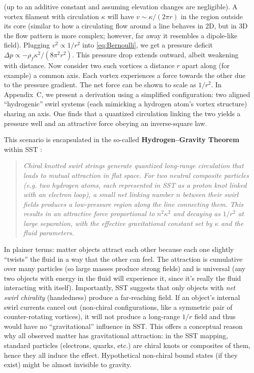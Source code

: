 \documentclass[10pt,reprint,aps,onecolumn,nofootinbib]{revtex4-2}
\newcommand{\rhoF}{\rho_{\!f}}     %
\begin{document}
(up to an additive constant and assuming elevation changes are negligible). A vortex filament with circulation $\kappa$ will have $v \sim \kappa/(2\pi r)$ in the region outside its core (similar to how a circulating flow around a line behaves in 2D, but in 3D the flow pattern is more complex; however, far away it resembles a dipole-like field). Plugging $v^2 \propto 1/r^2$ into \eqref{eq:Bernoulli}, we get a pressure deficit $\Delta p \propto -\rhoF \kappa^2/(8\pi^2 r^2)$. This pressure drop extends outward, albeit weakening with distance. Now consider two such vortices a distance $r$ apart along (for example) a common axis. Each vortex experiences a force towards the other due to the pressure gradient. The net force can be shown to scale as $1/r^2$. In Appendix~C, we present a derivation using a simplified configuration: two aligned ``hydrogenic'' swirl systems (each mimicking a hydrogen atom’s vortex structure) sharing an axis. One finds that a quantized circulation linking the two yields a pressure well and an attractive force obeying an inverse-square law.


This scenario is encapsulated in the so-called \textbf{Hydrogen–Gravity Theorem} within SST \cite{Verlinde2011}:

\begin{quote}

\emph{Chiral knotted swirl strings generate quantized long-range circulation that leads to mutual attraction in flat space. For two neutral composite particles (e.g. two hydrogen atoms, each represented in SST as a proton knot linked with an electron loop), a small net linking number $n$ between their swirl fields produces a low-pressure region along the line connecting them. This results in an attractive force proportional to $n^2\kappa^2$ and decaying as $1/r^2$ at large separation, with the effective gravitational constant set by $\kappa$ and the fluid parameters.}

\end{quote}

In plainer terms: matter objects attract each other because each one slightly ``twists'' the fluid in a way that the other can feel. The attraction is cumulative over many particles (so large masses produce strong fields) and is universal (any two objects with energy in the fluid will experience it, since it’s really the fluid interacting with itself). Importantly, SST suggests that only objects with \emph{net swirl chirality} (handedness) produce a far-reaching field. If an object’s internal swirl currents cancel out (non-chiral configurations, like a symmetric pair of counter-rotating vortices), it will not produce a long-range $1/r$ field and thus would have no “gravitational” influence in SST. This offers a conceptual reason why all observed matter has gravitational attraction: in the SST mapping, standard particles (electrons, quarks, etc.) are chiral knots or composites of them, hence they all induce the effect. Hypothetical non-chiral bound states (if they exist) might be almost invisible to gravity.
\end{document}

